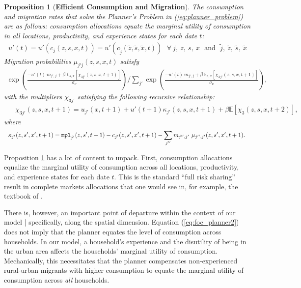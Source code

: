 \documentclass[12pt,pdftex]{article}
\newtheorem{proposition}{Proposition}
\begin{document}
\begin{proposition}[\textbf{Efficient Consumption and Migration}] \label{prp:efficient} The consumption and migration rates that solve the Planner's Problem in (\ref{eq:planner_problem}) are as follows: consumption allocations equate the marginal utility of consumption in all locations, productivity, and experience states for each date $t$:
{\small
\begin{align}
u'(t) = u'(c_{j}(z, s, x, t)) = u'(c_{\tilde{j}}(\tilde{z}, \tilde{s}, \tilde{x}, t)) \ \ \ \forall \ j, \ z , \ s, \ x \ \ \ \mbox{and} \ \ \ \tilde{j}, \ \tilde{z}, \ \tilde{s}, \ \tilde{x} 
\label{eq:foc_planner2}
\end{align}
}
Migration probabilities  $\mu_{j'j}(z,s,x,t)$ satisfy
{\footnotesize
\begin{align}
\exp \left(\frac{- u'(t) \ m_{j',j} + \beta \ \mathbb{E}_{s,x}\left[\chi_{3j'}(z,s,x, t+1)\right]}{\sigma_{\nu}} \right)  \Bigg / \sum_{j'} \exp \left( \frac{- u'(t)\ m_{j',j} + \beta \  \mathbb{E}_{s,x}\left[\chi_{3j'}(z,s,x, t+1) \right]}{\sigma_{\nu}} \right), \label{eq:migration_prob}
\end{align}
}
with the multipliers $\chi_{3j'}$ satisfying the following recursive relationship:
{\small
\begin{align}
& \ \ \chi_{3j'}(z, s, x, t+1) =  u_{j'}(x, t+1) +  u'(t+1) \kappa_{j'}(z, s,x,t+1) + \beta \mathbb{E}\left[\chi_{3}(z,s,x, t+2) \right], \label{eq:dynamic_multiplier}
\end{align}}
where
{\small
\begin{align}
& \ \ \kappa_{j'}(z, s',x',t+1) = \mbox{\texttt{mpl}}_{j'}(z,s',t+1) - c_{j'}(z, s',x',t+1) - \sum_{j''}  m_{j'',j'} \ \mu_{j'',j'}(z, s', x', t+1). \label{eq:kappa}
\end{align}}
\end{proposition}
Proposition \ref{prp:efficient} has a lot of content to unpack. First, consumption allocations equalize the marginal utility of consumption across all locations, productivity, and experience states for each date $t$. This is the standard ``full risk sharing'' result in complete markets allocations that one would see in, for example, the textbook of \citet{ljsa03}.

There is, however, an important point of departure within the context of our model | specifically, along the spatial dimension. Equation (\ref{eq:foc_planner2}) does not imply that the planner equates the level of consumption across households. In our model, a household's experience and the disutility of being in the urban area affects the households' marginal utility of consumption. Mechanically, this necessitates that the planner compensates non-experienced rural-urban migrants with higher consumption to equate the marginal utility of consumption across \emph{all} households.
\end{document}
